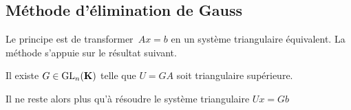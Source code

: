 








%
%
%
%
%
%
%
%


\subsection{Méthode d'élimination de Gauss}

Le principe est de transformer~$Ax=b$ en un système
triangulaire équivalent. La méthode s'appuie sur le résultat suivant.

\begin{proposition}
Il existe $G \in\mathrm{GL}_n(\mathbf{K})$ telle que $U = GA$ soit triangulaire supérieure.
\end{proposition}
Il ne reste alors plus qu'à résoudre le système triangulaire $Ux = Gb$

